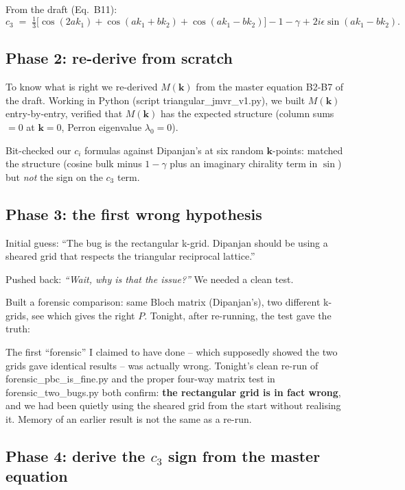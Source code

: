 \documentclass[11pt,a4paper]{article}
\newcommand{\vk}{\mathbf{k}}
\begin{document}
From the draft (Eq.~B11):
\[
c_3 \;=\; \tfrac{1}{3}\big[\cos(2 a k_1) + \cos(a k_1 + b k_2) + \cos(a k_1 - b k_2)\big] - 1 - \gamma \;\mathbf{+}\; 2 i \epsilon \sin(a k_1 - b k_2).
\]

\subsection{Phase 2: re-derive from scratch}\label{ssec:phase2}

To know what is right we re-derived $M(\vk)$ from the master equation
B2-B7 of the draft. Working in Python (script
{\sf triangular\_jmvr\_v1.py}), we built $M(\vk)$ entry-by-entry,
verified that $M(\vk)$ has the expected structure (column sums $= 0$ at
$\vk = 0$, Perron eigenvalue $\lambda_0 = 0$).

Bit-checked our $c_i$ formulas against Dipanjan's at six random
$\vk$-points: matched the structure (cosine bulk minus $1 - \gamma$
plus an imaginary chirality term in $\sin$) but \emph{not} the sign on
the $c_3$ term.

\subsection{Phase 3: the first wrong hypothesis}\label{ssec:phase3}

Initial guess: ``The bug is the rectangular k-grid. Dipanjan should be
using a sheared grid that respects the triangular reciprocal lattice.''

Pushed back: \emph{``Wait, why is that the issue?''} We needed a clean
test.

Built a forensic comparison: same Bloch matrix (Dipanjan's), two
different k-grids, see which gives the right $P$. Tonight, after
re-running, the test gave the truth:

\begin{intuition}
The first ``forensic'' I claimed to have done -- which supposedly showed
the two grids gave identical results -- was actually wrong. Tonight's
clean re-run of {\sf forensic\_pbc\_is\_fine.py} and the proper four-way
matrix test in {\sf forensic\_two\_bugs.py} both confirm: \textbf{the
rectangular grid is in fact wrong}, and we had been quietly using the
sheared grid from the start without realising it. Memory of an earlier
result is not the same as a re-run.
\end{intuition}

\subsection{Phase 4: derive the $c_3$ sign from the master equation}\label{ssec:phase4}
\end{document}
